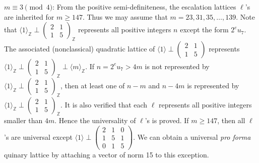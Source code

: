 \documentclass[a4paper,10pt,reqno]{amsart}
\begin{document}
{} $m \equiv 3 \pmod{4}$: From the positive semi-definiteness, the escalation
lattices $\ell$'s are inherited for $m \ge 147$. Thus we may assume that $m = 23, 31, 35, \dotsc,
139$. Note that ${\langle {1} \rangle}_{\mathbb{Z}} \perp {\begin{pmatrix}
  2 & 1 \\
  1 & 5
\end{pmatrix}}_{\mathbb{Z}}$ represents all positive integers $n$ except
the form $2^{e} u_7$. The associated (nonclassical) quadratic lattice of ${\langle {1} \rangle} \perp
{\begin{pmatrix}
  2 & 1 \\
  1 & 5
\end{pmatrix}}$ represents ${\langle {1} \rangle}_{\mathbb{Z}} \perp {\begin{pmatrix}
  2 & 1 \\
  1 & 5
\end{pmatrix}}_{\mathbb{Z}} \perp {\langle {m} \rangle}_{\mathbb{Z}}$. If $n=2^{e} u_7 >
4m$ is not represented by ${\langle {1} \rangle}_{\mathbb{Z}} \perp {\begin{pmatrix}
  2 & 1 \\
  1 & 5
\end{pmatrix}}_{\mathbb{Z}}$, then at least one of $n-m$ and $n -
4m$ is represented by ${\langle {1} \rangle}_{\mathbb{Z}} \perp {\begin{pmatrix}
  2 & 1 \\
  1 & 5
\end{pmatrix}}_{\mathbb{Z}}$. It is also verified that each $\ell$
represents all positive integers smaller than $4m$. Hence the universality of $\ell$'s is proved.
If $m \ge 147$, then all $\ell$'s are universal except ${\langle {1} \rangle} \perp
{\begin{pmatrix}
  {2} & {1} & {0} \\
  {1} & {5} & {1} \\
  {0} & {1} & {5}
\end{pmatrix}}$. We can obtain a universal \emph{pro forma} quinary lattice
by attaching a vector of norm 15 to this exception.
\end{document}

